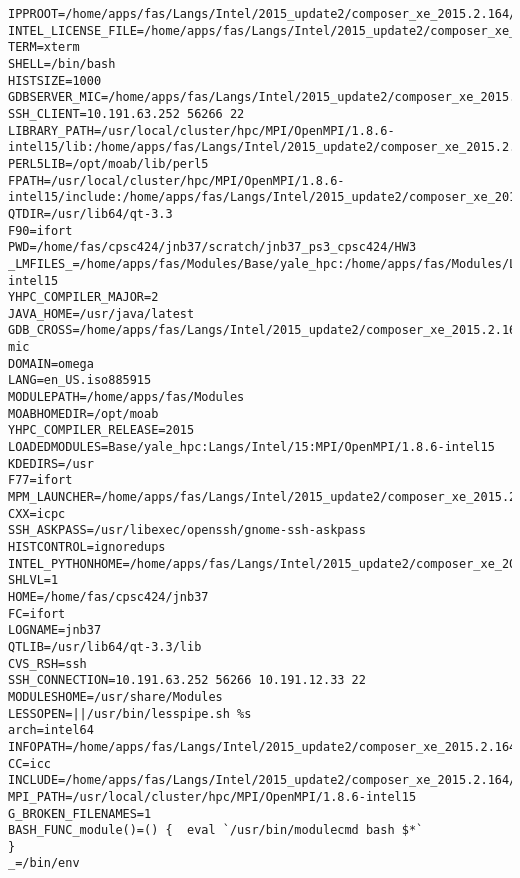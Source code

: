 \documentclass[11pt]{article}
\begin{document}
\begin{verbatim}
IPPROOT=/home/apps/fas/Langs/Intel/2015_update2/composer_xe_2015.2.164/ipp
INTEL_LICENSE_FILE=/home/apps/fas/Langs/Intel/2015_update2/composer_xe_2015.2.164/licenses:/opt/intel/licenses:/home/apps/fas/Licenses/intel_site.lic
TERM=xterm
SHELL=/bin/bash
HISTSIZE=1000
GDBSERVER_MIC=/home/apps/fas/Langs/Intel/2015_update2/composer_xe_2015.2.164/debugger/gdb/target/mic/bin/gdbserver
SSH_CLIENT=10.191.63.252 56266 22
LIBRARY_PATH=/usr/local/cluster/hpc/MPI/OpenMPI/1.8.6-intel15/lib:/home/apps/fas/Langs/Intel/2015_update2/composer_xe_2015.2.164/ipp/../compiler/lib/intel64:/home/apps/fas/Langs/Intel/2015_update2/composer_xe_2015.2.164/ipp/lib/intel64:/home/apps/fas/Langs/Intel/2015_update2/composer_xe_2015.2.164/compiler/lib/intel64:/home/apps/fas/Langs/Intel/2015_update2/composer_xe_2015.2.164/mkl/lib/intel64:/home/apps/fas/Langs/Intel/2015_update2/composer_xe_2015.2.164/tbb/lib/intel64/gcc4.4
PERL5LIB=/opt/moab/lib/perl5
FPATH=/usr/local/cluster/hpc/MPI/OpenMPI/1.8.6-intel15/include:/home/apps/fas/Langs/Intel/2015_update2/composer_xe_2015.2.164/mkl/include
QTDIR=/usr/lib64/qt-3.3
F90=ifort
PWD=/home/fas/cpsc424/jnb37/scratch/jnb37_ps3_cpsc424/HW3
_LMFILES_=/home/apps/fas/Modules/Base/yale_hpc:/home/apps/fas/Modules/Langs/Intel/15:/home/apps/fas/Modules/MPI/OpenMPI/1.8.6-intel15
YHPC_COMPILER_MAJOR=2
JAVA_HOME=/usr/java/latest
GDB_CROSS=/home/apps/fas/Langs/Intel/2015_update2/composer_xe_2015.2.164/debugger/gdb/intel64_mic/bin/gdb-mic
DOMAIN=omega
LANG=en_US.iso885915
MODULEPATH=/home/apps/fas/Modules
MOABHOMEDIR=/opt/moab
YHPC_COMPILER_RELEASE=2015
LOADEDMODULES=Base/yale_hpc:Langs/Intel/15:MPI/OpenMPI/1.8.6-intel15
KDEDIRS=/usr
F77=ifort
MPM_LAUNCHER=/home/apps/fas/Langs/Intel/2015_update2/composer_xe_2015.2.164/debugger/mpm/bin/start_mpm.sh
CXX=icpc
SSH_ASKPASS=/usr/libexec/openssh/gnome-ssh-askpass
HISTCONTROL=ignoredups
INTEL_PYTHONHOME=/home/apps/fas/Langs/Intel/2015_update2/composer_xe_2015.2.164/debugger/python/intel64/
SHLVL=1
HOME=/home/fas/cpsc424/jnb37
FC=ifort
LOGNAME=jnb37
QTLIB=/usr/lib64/qt-3.3/lib
CVS_RSH=ssh
SSH_CONNECTION=10.191.63.252 56266 10.191.12.33 22
MODULESHOME=/usr/share/Modules
LESSOPEN=||/usr/bin/lesspipe.sh %s
arch=intel64
INFOPATH=/home/apps/fas/Langs/Intel/2015_update2/composer_xe_2015.2.164/debugger/gdb/intel64/share/info/:/home/apps/fas/Langs/Intel/2015_update2/composer_xe_2015.2.164/debugger/gdb/intel64_mic/share/info/
CC=icc
INCLUDE=/home/apps/fas/Langs/Intel/2015_update2/composer_xe_2015.2.164/mkl/include
MPI_PATH=/usr/local/cluster/hpc/MPI/OpenMPI/1.8.6-intel15
G_BROKEN_FILENAMES=1
BASH_FUNC_module()=() {  eval `/usr/bin/modulecmd bash $*`
}
_=/bin/env
\end{verbatim}
\end{document}
